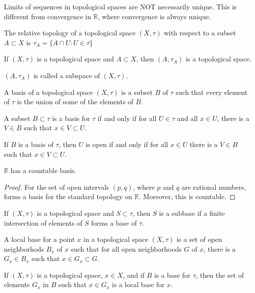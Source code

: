     Limits of sequences in topological spaces are NOT
    necessarily unique. This is different from convergence
    in $\mathbb{R}$, where convergence is always unique.
    \begin{definition}
        The relative topology of a
        topological space $(X,\tau)$ with
        respect to a subset $A\subset{X}$
        is $\tau_{A}=\{A\cap{U}:U\in\tau\}$
    \end{definition}
    \begin{theorem}
        If $(X,\tau)$ is a topological space and
        $A\subset{X}$, then
        $(A,\tau_{A})$ is a topological space.
    \end{theorem}
    $(A,\tau_{A})$ is called a subspace of
    $(X,\tau)$.
    \begin{definition}
        A basis of a topological space
        $(X,\tau)$ is a subset $B$ of
        $\tau$ such that every element
        of $\tau$ is the union of some of the
        elements of $B$.
    \end{definition}
    \begin{theorem}
        A subset $B\subset\tau$ is a basis
        for $\tau$ if and only if for all
        $U\in\tau$ and all $x\in{U}$, there is
        a $V\in{B}$ such that
        $x\in{V}\subset{U}$.
    \end{theorem}
    \begin{theorem}
        If $B$ is a basis of $\tau$, then
        $U$ is open if and only if for all
        $x\in{U}$ there is a $V\in{B}$ such that
        $x\in{V}\subset{U}$.
    \end{theorem}
    \begin{theorem}
        $\mathbb{R}$ has a countable basis.
    \end{theorem}
    \begin{proof}
        For the set of open intervals
        $(p,q)$, where $p$ and $q$ are rational
        numbers, forms a basis for the standard
        topology on $\mathbb{R}$. Moreover, this
        is countable.
    \end{proof}
    \begin{definition}
        If $(X,\tau)$ is a topological space
        and $S\subset\tau$, then $S$ is a subbase
        if a finite intersection of elements of $S$
        forms a base of $\tau$.
    \end{definition}
    \begin{definition}
        A local base for a point
        $x$ in a topological space $(X,\tau)$
        is a set of open neighborhods $B_{x}$ of
        $x$ such that for all open neighborhoods $G$
        of $x$, there is a $G_{x}\in{B_{x}}$ such that
        $x\in{G_{x}}\subset{G}$.
    \end{definition}
    \begin{theorem}
        If $(X,\tau)$ is a topological space, $x\in{X}$,
        and if $B$ is a base for $\tau$, then
        the set of elements $G_{x}$ in $B$ such that
        $x\in{G_{x}}$ is a local base for $x$.
    \end{theorem}
